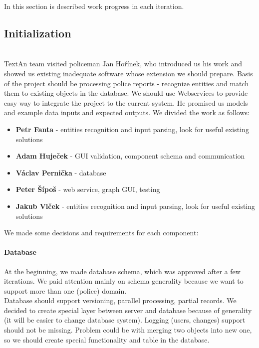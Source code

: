 In this section is described work progress in each iteration.

\subsection{Initialization}
\\
TextAn team visited policeman Jan Hořínek, who introduced us his work and showed
us existing inadequate software whose extension we should prepare. Basis of the
project should be processing police reports - recognize entities and match them
to existing objects in the database. We should use Webservices to provide easy
way to integrate the project to the current system. He promised us models and
example data inputs and expected outputs. We divided the work as follows:

\begin{itemize}
\item \textbf{Petr Fanta} - entities recognition and input parsing, look for useful existing solutions
\item \textbf{Adam Huječek} - GUI validation, component schema and communication
\item \textbf{Václav Pernička} - database
\item \textbf{Peter Šípoš} - web service, graph GUI, testing
\item \textbf{Jakub Vlček} - entities recognition and input parsing, look for useful existing solutions
\end{itemize}

We made some decisions and requirements for each component:

\paragraph{Database}
At the beginning, we made database schema, which was approved after a few
iterations. We paid attention mainly on schema generality because we want to
support more than one (police) domain.\\
Database should support versioning, parallel processing, partial records. We
decided to create special layer between server and database because of
generality (it will be easier to change database system). Logging (users,
changes) support should not be missing. Problem could be with merging two
objects into new one, so we should create special functionality and table in the
database.

